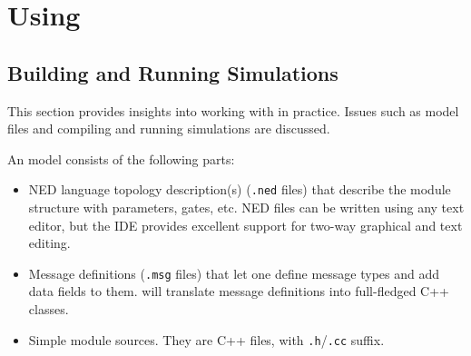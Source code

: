 %
%
%
%
%
%
%


\section{Using {\opp}}
\label{sec:overview:using-omnetpp}


\subsection{Building and Running Simulations}
\label{sec:overview:building-and-running-simulations}

This section provides insights into working with {\opp} in practice.
Issues such as model files and compiling and running simulations are
discussed.

An {\opp} model consists of the following parts:
\begin{itemize}
  \item{NED language topology description(s) (\texttt{.ned} files)
    that describe the module structure with parameters, gates, etc.
    NED files can be written using any text editor, but the {\opp} IDE
    provides excellent support for two-way graphical and text editing.}
  \item{Message definitions (\texttt{.msg} files) that let one define message
    types and add data fields to them. {\opp} will translate message definitions
    into full-fledged C++ classes.}
  \item{Simple module sources. They are C++ files, with \texttt{.h}/\texttt{.cc} suffix.}
\end{itemize}

